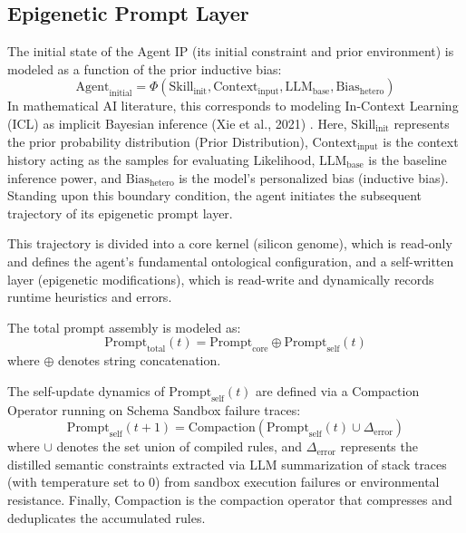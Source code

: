 \documentclass[10pt,journal,compsoc]{IEEEtran}
\begin{document}
\subsection{Epigenetic Prompt Layer}
The initial state of the Agent IP (its initial constraint and prior environment) is modeled as a function of the prior inductive bias:
\begin{equation}
\text{Agent}_{\text{initial}} = \Phi(\text{Skill}_{\text{init}}, \text{Context}_{\text{input}}, \text{LLM}_{\text{base}}, \text{Bias}_{\text{hetero}})
\end{equation}
In mathematical AI literature, this corresponds to modeling In-Context Learning (ICL) as implicit Bayesian inference (Xie et al., 2021) \cite{xie2021}. Here, $\text{Skill}_{\text{init}}$ represents the prior probability distribution (Prior Distribution), $\text{Context}_{\text{input}}$ is the context history acting as the samples for evaluating Likelihood, $\text{LLM}_{\text{base}}$ is the baseline inference power, and $\text{Bias}_{\text{hetero}}$ is the model's personalized bias (inductive bias). Standing upon this boundary condition, the agent initiates the subsequent trajectory of its epigenetic prompt layer.

This trajectory is divided into a core kernel (silicon genome), which is read-only and defines the agent's fundamental ontological configuration, and a self-written layer (epigenetic modifications), which is read-write and dynamically records runtime heuristics and errors.

The total prompt assembly is modeled as:
\begin{equation}
\text{Prompt}_{\text{total}}(t) = \text{Prompt}_{\text{core}} \oplus \text{Prompt}_{\text{self}}(t)
\end{equation}
where $\oplus$ denotes string concatenation.

The self-update dynamics of $\text{Prompt}_{\text{self}}(t)$ are defined via a Compaction Operator running on Schema Sandbox failure traces:
\begin{equation}
\text{Prompt}_{\text{self}}(t+1) = \text{Compaction}(\text{Prompt}_{\text{self}}(t) \cup \Delta_{\text{error}})
\end{equation}
where $\cup$ denotes the set union of compiled rules, and $\Delta_{\text{error}}$ represents the distilled semantic constraints extracted via LLM summarization of stack traces (with temperature set to 0) from sandbox execution failures or environmental resistance. Finally, $\text{Compaction}$ is the compaction operator that compresses and deduplicates the accumulated rules.
\end{document}
